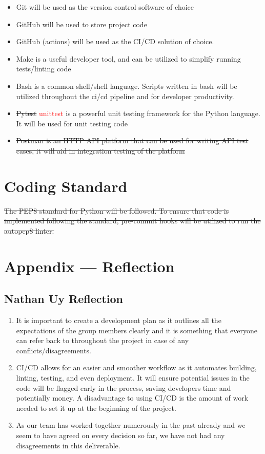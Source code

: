 \documentclass{article}
\begin{document}
\begin{itemize}
    \item Git will be used as the version control software of choice
    \item GitHub will be used to store project code
    \item GitHub (actions) will be used as the CI/CD solution of choice.
    \item Make is a useful developer tool, and can be utilized to simplify running tests/linting code
    \item Bash is a common shell/shell language. Scripts written in bash will be utilized throughout the ci/cd pipeline and for developer productivity.
    \item \sout{Pytest} \textcolor{red}{unittest} is a powerful unit testing framework for the Python language. It will be used for unit testing code
    \item \sout{Postman is an HTTP API platform that can be used for writing API test cases, it will aid in integration testing of the platform}
\end{itemize}


\section{Coding Standard}

\sout{The PEP8 standard for Python will be followed. To ensure that code is implemented following the standard, pre-commit hooks will be utilized to run the autopep8 linter.}

\newpage{}

\section*{Appendix --- Reflection}

\subsection*{Nathan Uy Reflection}
\begin{enumerate}
    \item It is important to create a development plan as it outlines all the expectations of the group members clearly and it is something that everyone can refer back to throughout the project in case of any conflicts/disagreements.
    \item CI/CD allows for an easier and smoother workflow as it automates building, linting, testing, and even deployment. It will ensure potential issues in the code will be flagged early in the process, saving developers time and potentially money. A disadvantage to using CI/CD is the amount of work needed to set it up at the beginning of the project.
    \item As our team has worked together numerously in the past already and we seem to have agreed on every decision so far, we have not had any disagreements in this deliverable.
\end{enumerate}
\end{document}
